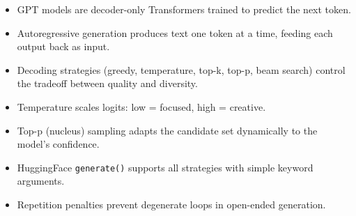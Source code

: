 \begin{itemize}
  \item GPT models are decoder-only Transformers trained to predict the next token.
  \item Autoregressive generation produces text one token at a time, feeding each output back as input.
  \item Decoding strategies (greedy, temperature, top-k, top-p, beam search) control the tradeoff between quality and diversity.
  \item Temperature scales logits: low = focused, high = creative.
  \item Top-p (nucleus) sampling adapts the candidate set dynamically to the model's confidence.
  \item HuggingFace \texttt{generate()} supports all strategies with simple keyword arguments.
  \item Repetition penalties prevent degenerate loops in open-ended generation.
\end{itemize}
